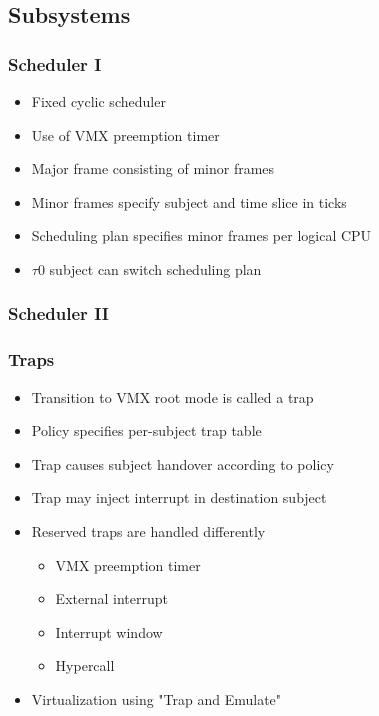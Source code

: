 \documentclass[xcolor={dvipsnames}]{beamer}
\begin{document}
\subsection{Subsystems}
\begin{frame}\frametitle{Scheduler I}
\begin{itemize}
	\item Fixed cyclic scheduler
	\item Use of VMX preemption timer
	\item Major frame consisting of minor frames
	\item Minor frames specify subject and time slice in ticks
	\item Scheduling plan specifies minor frames per logical CPU
	\item $\tau$0 subject can switch scheduling plan
\end{itemize}

\end{frame}

\begin{frame}\frametitle{Scheduler II}
\begin{center}
	
\end{center}
\end{frame}

\begin{frame}[fragile]\frametitle{Traps}
\begin{itemize}
	\item Transition to VMX root mode is called a trap
	\item Policy specifies per-subject trap table
	\item Trap causes subject handover according to policy
	\item Trap may inject interrupt in destination subject
	\item Reserved traps are handled differently
		\begin{itemize}
			\item VMX preemption timer
			\item External interrupt
			\item Interrupt window
			\item Hypercall
		\end{itemize}
	\item Virtualization using "Trap and Emulate"
\end{itemize}

\end{frame}
\end{document}
